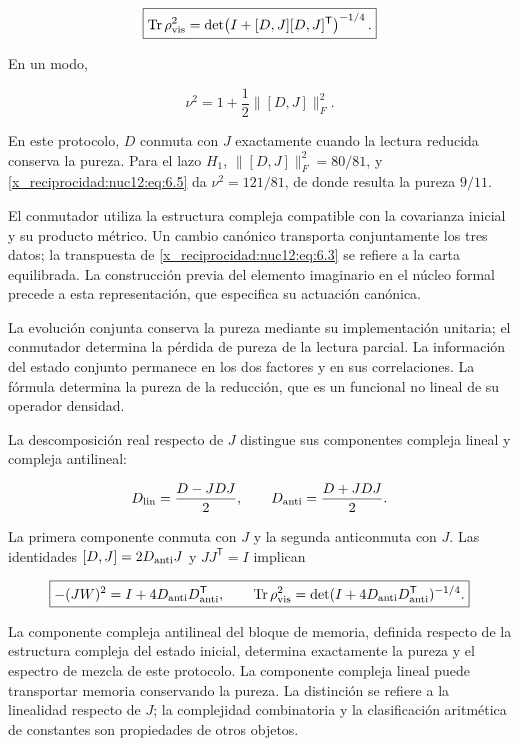 \begin{equation}
\boxed{\operatorname{Tr}\rho_{\rm vis}^2
=\det\!\left(I+[D,J][D,J]^{\mathsf T}\right)^{-1/4}.}
\label{x_reciprocidad:nuc12:eq:6.4}
\end{equation}



En un modo,



\begin{equation}
\nu^2=1+\frac12\|[D,J]\|_F^2.
\label{x_reciprocidad:nuc12:eq:6.5}
\end{equation}



En este protocolo, \(D\) conmuta con \(J\) exactamente cuando la lectura reducida conserva la pureza. Para el lazo \(H_1\), \(\|[D,J]\|_F^2=80/81\), y \eqref{x_reciprocidad:nuc12:eq:6.5} da \(\nu^2=121/81\), de donde resulta la pureza \(9/11\).

El conmutador utiliza la estructura compleja compatible con la covarianza inicial y su producto métrico. Un cambio canónico transporta conjuntamente los tres datos; la transpuesta de \eqref{x_reciprocidad:nuc12:eq:6.3} se refiere a la carta equilibrada. La construcción previa del elemento imaginario en el núcleo formal precede a esta representación, que especifica su actuación canónica.

La evolución conjunta conserva la pureza mediante su implementación unitaria; el conmutador determina la pérdida de pureza de la lectura parcial. La información del estado conjunto permanece en los dos factores y en sus correlaciones. La fórmula determina la pureza de la reducción, que es un funcional no lineal de su operador densidad.

La descomposición real respecto de \(J\) distingue sus componentes compleja lineal y compleja antilineal:



\[
D_{\rm lin}=\frac{D-JDJ}{2},\qquad
D_{\rm anti}=\frac{D+JDJ}{2}.
\]



La primera componente conmuta con \(J\) y la segunda anticonmuta con \(J\). Las identidades
\([D,J]=2D_{\rm anti}J\) y \(JJ^{\mathsf T}=I\) implican



\begin{equation}
\boxed{-(JW)^2=I+4D_{\rm anti}D_{\rm anti}^{\mathsf T},\qquad
\operatorname{Tr}\rho_{\rm vis}^2
=\det(I+4D_{\rm anti}D_{\rm anti}^{\mathsf T})^{-1/4}.}
\label{x_reciprocidad:nuc12:eq:6.6}
\end{equation}



La componente compleja antilineal del bloque de memoria, definida respecto de la estructura compleja del estado inicial, determina exactamente la pureza y el espectro de mezcla de este protocolo. La componente compleja lineal puede transportar memoria conservando la pureza. La distinción se refiere a la linealidad respecto de \(J\); la complejidad combinatoria y la clasificación aritmética de constantes son propiedades de otros objetos.
